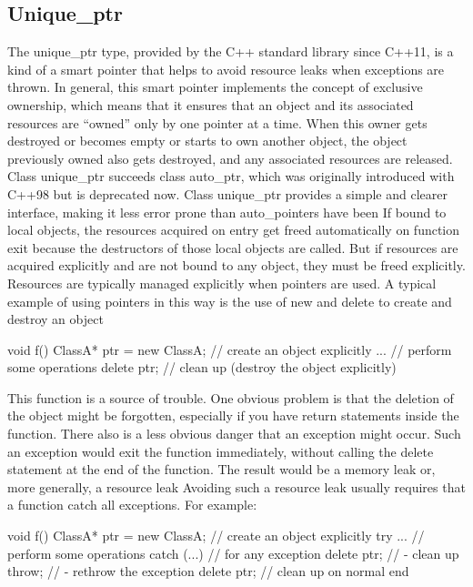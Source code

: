 \documentclass{report}
\begin{document}
\bigbreak \noindent
\subsection{Unique\_ptr}
\bigbreak \noindent 
The unique\_ptr type, provided by the C++ standard library since C++11, is a kind of a smart pointer that helps to avoid resource leaks when exceptions are thrown. In general, this smart pointer implements the concept of exclusive ownership, which means that it ensures that an object and its associated resources are “owned” only by one pointer at a time. When this owner gets destroyed or becomes empty or starts to own another object, the object previously owned also gets destroyed, and any associated resources are released.
\bigbreak \noindent 
Class unique\_ptr succeeds class auto\_ptr, which was originally introduced with C++98 but is deprecated now. Class unique\_ptr provides a simple and clearer interface, making it less error prone than auto\_pointers have been
\bigbreak \noindent 
If bound to local objects, the resources acquired on entry get freed automatically on function exit
because the destructors of those local objects are called. But if resources are acquired explicitly
and are not bound to any object, they must be freed explicitly. Resources are typically managed
explicitly when pointers are used.
\bigbreak \noindent 
A typical example of using pointers in this way is the use of new and delete to create and destroy an object
\bigbreak \noindent 
\begin{cppcode}
    void f()
    {
        ClassA* ptr = new ClassA; // create an object explicitly
        ... // perform some operations
        delete ptr; // clean up (destroy the object explicitly)
    }
\end{cppcode}
\bigbreak \noindent 
This function is a source of trouble. One obvious problem is that the deletion of the object might be
forgotten, especially if you have return statements inside the function. There also is a less obvious
danger that an exception might occur. Such an exception would exit the function immediately,
without calling the delete statement at the end of the function. The result would be a memory leak
or, more generally, a resource leak
\bigbreak \noindent 
Avoiding such a resource leak usually requires that a function catch all exceptions. For example:
\bigbreak \noindent 
\begin{cppcode}
    void f()
    {
        ClassA* ptr = new ClassA; // create an object explicitly
        try {
            ... // perform some operations
        }
        catch (...) { // for any exception
            delete ptr; // - clean up
            throw; // - rethrow the exception
        }
        delete ptr; // clean up on normal end
    }
\end{cppcode}
\end{document}
